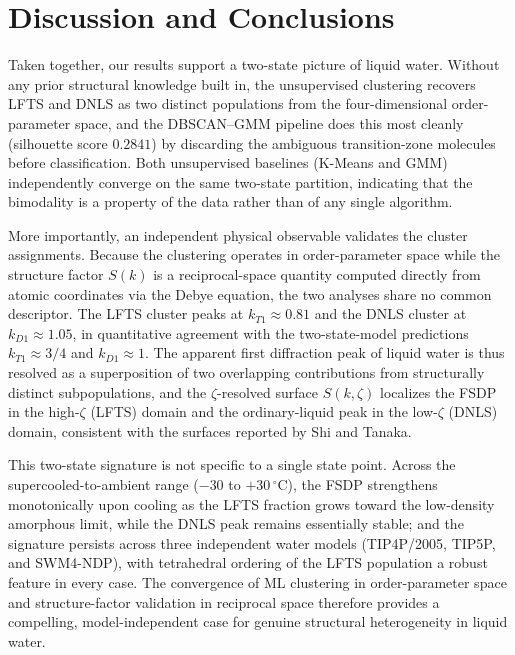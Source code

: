 \documentclass[aps, amsmath,amssymb, reprint, twocolumn, superscriptaddress]{revtex4-2}
\begin{document}
\FloatBarrier


\section{Discussion and Conclusions}
\label{sec:discussion}

Taken together, our results support a two-state picture of liquid water. Without any prior structural knowledge built in, the unsupervised clustering recovers LFTS and DNLS as two distinct populations from the four-dimensional order-parameter space, and the DBSCAN--GMM pipeline does this most cleanly (silhouette score $0.2841$) by discarding the ambiguous transition-zone molecules before classification. Both unsupervised baselines (K-Means and GMM) independently converge on the same two-state partition, indicating that the bimodality is a property of the data rather than of any single algorithm.

More importantly, an independent physical observable validates the cluster assignments. Because the clustering operates in order-parameter space while the structure factor $S(k)$ is a reciprocal-space quantity computed directly from atomic coordinates via the Debye equation, the two analyses share no common descriptor. The LFTS cluster peaks at $k_{T1} \approx 0.81$ and the DNLS cluster at $k_{D1} \approx 1.05$, in quantitative agreement with the two-state-model predictions $k_{T1} \approx 3/4$ and $k_{D1} \approx 1$. The apparent first diffraction peak of liquid water is thus resolved as a superposition of two overlapping contributions from structurally distinct subpopulations, and the $\zeta$-resolved surface $S(k,\zeta)$ localizes the FSDP in the high-$\zeta$ (LFTS) domain and the ordinary-liquid peak in the low-$\zeta$ (DNLS) domain, consistent with the surfaces reported by Shi and Tanaka.

This two-state signature is not specific to a single state point. Across the supercooled-to-ambient range ($-30$ to $+30\,^\circ$C), the FSDP strengthens monotonically upon cooling as the LFTS fraction grows toward the low-density amorphous limit, while the DNLS peak remains essentially stable; and the signature persists across three independent water models (TIP4P/2005, TIP5P, and SWM4-NDP), with tetrahedral ordering of the LFTS population a robust feature in every case. The convergence of ML clustering in order-parameter space and structure-factor validation in reciprocal space therefore provides a compelling, model-independent case for genuine structural heterogeneity in liquid water.
\end{document}
